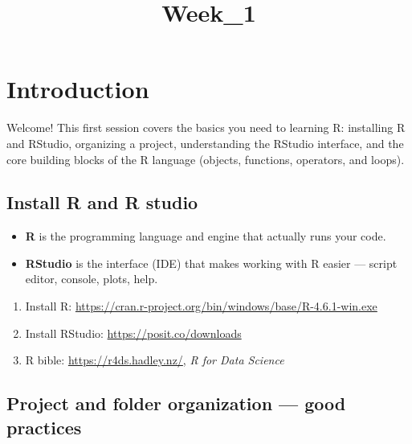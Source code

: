 \documentclass[
  letterpaper,
  DIV=11,
  numbers=noendperiod]{scrartcl}
\title{Week\_1}
\author{}
\date{}
\providecommand{\tightlist}{%
  \setlength{\itemsep}{0pt}\setlength{\parskip}{0pt}}
\begin{document}
\maketitle


\section{Introduction}\label{introduction}

Welcome! This first session covers the basics you need to learning R:
installing R and RStudio, organizing a project, understanding the
RStudio interface, and the core building blocks of the R language
(objects, functions, operators, and loops).

\subsection{Install R and R studio}\label{install-r-and-r-studio}

\begin{itemize}
\tightlist
\item
  \textbf{R} is the programming language and engine that actually runs
  your code.
\item
  \textbf{RStudio} is the interface (IDE) that makes working with R
  easier --- script editor, console, plots, help.
\end{itemize}

\begin{enumerate}
\def\labelenumi{\arabic{enumi}.}
\item
  Install R:
  \url{https://cran.r-project.org/bin/windows/base/R-4.6.1-win.exe}
\item
  Install RStudio: \url{https://posit.co/downloads}
\item
  R bible: \url{https://r4ds.hadley.nz/}, \emph{R for Data Science}
\end{enumerate}

\subsection{Project and folder organization --- good
practices}\label{project-and-folder-organization-good-practices}
\end{document}
